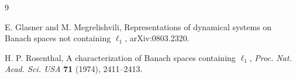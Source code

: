 \documentclass[11pt]{article}
\begin{document}
\begin{thebibliography}{9}

E. Glasner and M. Megrelishvili,
\newblock Representations of dynamical systems on Banach spaces not containing
\(\ell_1\),
\newblock arXiv:0803.2320.

H. P. Rosenthal,
\newblock A characterization of Banach spaces containing \(\ell_1\),
\newblock \emph{Proc. Nat. Acad. Sci. USA} \textbf{71} (1974), 2411--2413.

\end{thebibliography}
\end{document}
